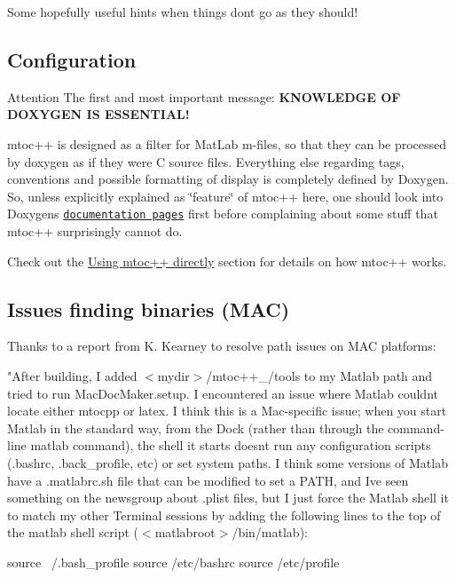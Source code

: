 Some hopefully useful hints when things dont go as they should!\hypertarget{troubleshooting_ts_config}{}\subsection{Configuration}\label{troubleshooting_ts_config}
\begin{DoxyAttention}{Attention}
The first and most important message\+: {\bfseries K\+N\+O\+W\+L\+E\+D\+G\+E O\+F D\+O\+X\+Y\+G\+E\+N I\+S E\+S\+S\+E\+N\+T\+I\+A\+L!}
\end{DoxyAttention}
mtoc++ is designed as a filter for Mat\+Lab m-\/files, so that they can be processed by doxygen as if they were C source files. Everything else regarding tags, conventions and possible formatting of display is completely defined by Doxygen. So, unless explicitly explained as \char`\"{}feature\char`\"{} of mtoc++ here, one should look into Doxygen\textquotesingle{}s \href{http://www.stack.nl/~dimitri/doxygen/manual.html}{\tt documentation pages} first before complaining about some stuff that mtoc++ surprisingly cannot do.

Check out the \hyperlink{tools_tools_direct}{Using mtoc++ directly} section for details on how mtoc++ works.\hypertarget{troubleshooting_ts_path}{}\subsection{Issues finding binaries (\+M\+A\+C)}\label{troubleshooting_ts_path}
Thanks to a report from K. Kearney to resolve path issues on M\+A\+C platforms\+:

"After building, I added {\ttfamily } $<$mydir$>$/mtoc++\+\_/tools to my Matlab path and tried to run Mac\+Doc\+Maker.\+setup. I encountered an issue where Matlab couldn\textquotesingle{}t locate either mtocpp or latex. I think this is a Mac-\/specific issue; when you start Matlab in the standard way, from the Dock (rather than through the command-\/line matlab command), the shell it starts doesn\textquotesingle{}t run any configuration scripts (.bashrc, .back\+\_\+profile, etc) or set system paths. I think some versions of Matlab have a .matlabrc.\+sh file that can be modified to set a P\+A\+T\+H, and I\textquotesingle{}ve seen something on the newsgroup about .plist files, but I just force the Matlab shell it to match my other Terminal sessions by adding the following lines to the top of the matlab shell script ($<$matlabroot$>$/bin/matlab)\+: 
\begin{DoxyCode}
source ~/.bash\_profile
source /etc/bashrc
source /etc/profile
\end{DoxyCode}


